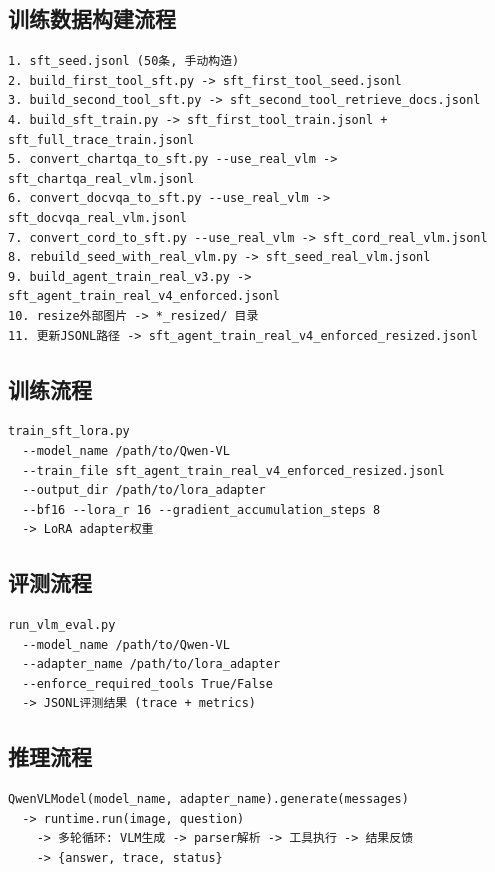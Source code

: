 \documentclass[fontset=none,11pt,a4paper]{ctexart}
\begin{document}
\subsection{训练数据构建流程}

\begin{verbatim}
1. sft_seed.jsonl (50条, 手动构造)
2. build_first_tool_sft.py -> sft_first_tool_seed.jsonl
3. build_second_tool_sft.py -> sft_second_tool_retrieve_docs.jsonl
4. build_sft_train.py -> sft_first_tool_train.jsonl + sft_full_trace_train.jsonl
5. convert_chartqa_to_sft.py --use_real_vlm -> sft_chartqa_real_vlm.jsonl
6. convert_docvqa_to_sft.py --use_real_vlm -> sft_docvqa_real_vlm.jsonl
7. convert_cord_to_sft.py --use_real_vlm -> sft_cord_real_vlm.jsonl
8. rebuild_seed_with_real_vlm.py -> sft_seed_real_vlm.jsonl
9. build_agent_train_real_v3.py -> sft_agent_train_real_v4_enforced.jsonl
10. resize外部图片 -> *_resized/ 目录
11. 更新JSONL路径 -> sft_agent_train_real_v4_enforced_resized.jsonl
\end{verbatim}

\subsection{训练流程}

\begin{verbatim}
train_sft_lora.py
  --model_name /path/to/Qwen-VL
  --train_file sft_agent_train_real_v4_enforced_resized.jsonl
  --output_dir /path/to/lora_adapter
  --bf16 --lora_r 16 --gradient_accumulation_steps 8
  -> LoRA adapter权重
\end{verbatim}

\subsection{评测流程}

\begin{verbatim}
run_vlm_eval.py
  --model_name /path/to/Qwen-VL
  --adapter_name /path/to/lora_adapter
  --enforce_required_tools True/False
  -> JSONL评测结果 (trace + metrics)
\end{verbatim}

\subsection{推理流程}

\begin{verbatim}
QwenVLModel(model_name, adapter_name).generate(messages)
  -> runtime.run(image, question)
    -> 多轮循环: VLM生成 -> parser解析 -> 工具执行 -> 结果反馈
    -> {answer, trace, status}
\end{verbatim}
\end{document}
